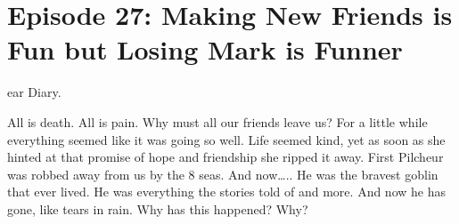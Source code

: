 \section{Episode 27: Making New Friends is Fun but Losing Mark is Funner}

\medskip

ear Diary.\medskip

All is death. All is pain. Why must all our friends leave us? For a little while everything seemed like it was going so well. Life seemed kind, yet as soon as she hinted at that promise of hope and friendship she ripped it away. First Pilcheur was robbed away from us by the 8 seas. And now….. He was the bravest goblin that ever lived. He was everything the stories told of and more. And now he has gone, like tears in rain. Why has this happened? Why?\medskip

